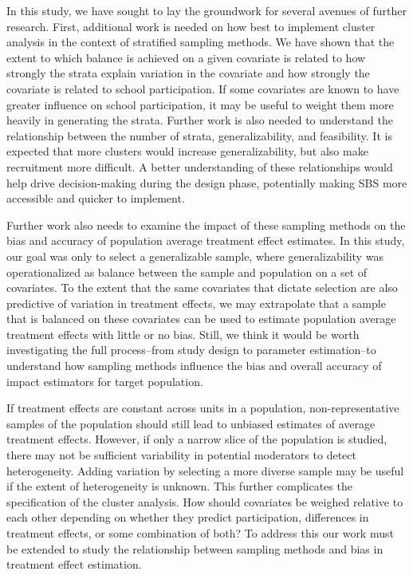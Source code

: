 \documentclass[
  english,
  man,floatsintext]{apa6}
\begin{document}
In this study, we have sought to lay the groundwork for several avenues of further research. First, additional work is needed on how best to implement cluster analysis in the context of stratified sampling methods. We have shown that the extent to which balance is achieved on a given covariate is related to how strongly the strata explain variation in the covariate and how strongly the covariate is related to school participation. If some covariates are known to have greater influence on school participation, it may be useful to weight them more heavily in generating the strata. Further work is also needed to understand the relationship between the number of strata, generalizability, and feasibility. It is expected that more clusters would increase generalizability, but also make recruitment more difficult. A better understanding of these relationships would help drive decision-making during the design phase, potentially making SBS more accessible and quicker to implement.

Further work also needs to examine the impact of these sampling methods on the bias and accuracy of population average treatment effect estimates. In this study, our goal was only to select a generalizable sample, where generalizability was operationalized as balance between the sample and population on a set of covariates. To the extent that the same covariates that dictate selection are also predictive of variation in treatment effects, we may extrapolate that a sample that is balanced on these covariates can be used to estimate population average treatment effects with little or no bias. Still, we think it would be worth investigating the full process--from study design to parameter estimation--to understand how sampling methods influence the bias and overall accuracy of impact estimators for target population.

If treatment effects are constant across units in a population, non-representative samples of the population should still lead to unbiased estimates of average treatment effects. However, if only a narrow slice of the population is studied, there may not be sufficient variability in potential moderators to detect heterogeneity. Adding variation by selecting a more diverse sample may be useful if the extent of heterogeneity is unknown. This further complicates the specification of the cluster analysis. How should covariates be weighed relative to each other depending on whether they predict participation, differences in treatment effects, or some combination of both? To address this our work must be extended to study the relationship between sampling methods and bias in treatment effect estimation.
\end{document}
